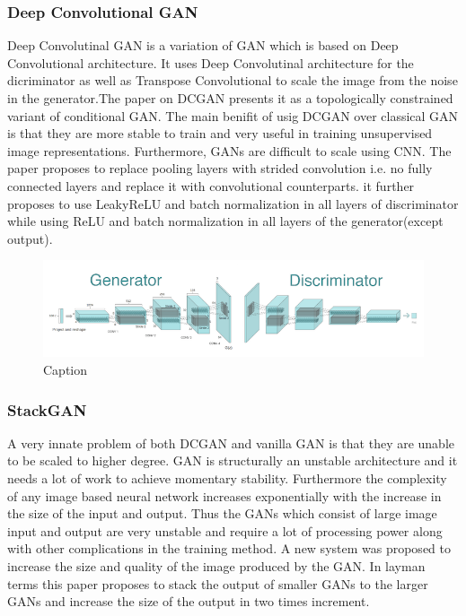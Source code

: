 \documentclass{article}
\begin{document}
\subsubsection{Deep Convolutional GAN}
Deep Convolutinal GAN is a variation of GAN which is based on Deep Convolutional architecture. It uses Deep Convolutinal architecture for the dicriminator as well as Transpose Convolutional to scale the image from the noise in the generator.The paper on DCGAN presents it as a topologically constrained variant of conditional GAN. The main benifit of usig DCGAN over classical GAN is that they are more stable to train and very useful in training unsupervised image representations. Furthermore, GANs are difficult to scale using CNN. The paper proposes to replace pooling layers with strided convolution i.e. no fully connected layers and replace it with convolutional counterparts. it further proposes to use LeakyReLU and batch normalization in all layers of discriminator while using ReLU and batch normalization in all layers of the generator(except output).
\begin{figure}
    \centering
    \includegraphics[width=15cm]{images/GAN/DCGAN.png}
    \caption{Caption}
    \label{Architecture of Deep Learning GAN}
\end{figure}

\subsubsection{StackGAN}
A very innate problem of both DCGAN and vanilla GAN is that they are unable to be scaled to higher degree. GAN is structurally an unstable architecture and it needs a lot of work to achieve momentary stability. Furthermore the complexity of any image based neural network increases exponentially with the increase in the size of the input and output. Thus the GANs which consist of large image input and output are very unstable and require a lot of processing power along with other complications in the training method. A new system was proposed to increase the size and quality of the image produced by the GAN. In layman terms this paper proposes to stack the output of smaller GANs to the larger GANs and increase the size of the output in two times increment.
\end{document}
